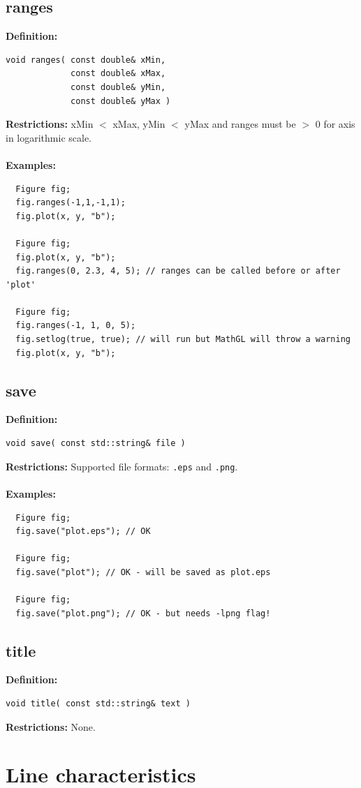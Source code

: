 \documentclass[a4paper]{article}
\newcommand{\command}[1]{\subsection{#1}}
\begin{document}
\command{ranges}

\textbf{Definition:}
\begin{lstlisting}
void ranges( const double& xMin, 
             const double& xMax, 
             const double& yMin, 
             const double& yMax )
\end{lstlisting}
%
\textbf{Restrictions:} xMin $<$ xMax, yMin $<$ yMax and ranges must be $>$ 0 for axis in logarithmic scale. \\ \\
%
\textbf{Examples:}
\begin{lstlisting}
  Figure fig;
  fig.ranges(-1,1,-1,1);
  fig.plot(x, y, "b");

  Figure fig;
  fig.plot(x, y, "b");
  fig.ranges(0, 2.3, 4, 5); // ranges can be called before or after 'plot'

  Figure fig;
  fig.ranges(-1, 1, 0, 5);
  fig.setlog(true, true); // will run but MathGL will throw a warning 
  fig.plot(x, y, "b");
\end{lstlisting}

\newpage
\command{save}

\textbf{Definition:}
\begin{lstlisting}
void save( const std::string& file )
\end{lstlisting}
%
\textbf{Restrictions:} Supported file formats: \texttt{.eps} and \texttt{.png}. \\ \\
%
\textbf{Examples:}
\begin{lstlisting}
  Figure fig;
  fig.save("plot.eps"); // OK

  Figure fig;
  fig.save("plot"); // OK - will be saved as plot.eps

  Figure fig;
  fig.save("plot.png"); // OK - but needs -lpng flag!
\end{lstlisting}

\command{title}

\textbf{Definition:}
\begin{lstlisting}
void title( const std::string& text )
\end{lstlisting}
%
\textbf{Restrictions:} None.

\section{Line characteristics}
\end{document}
